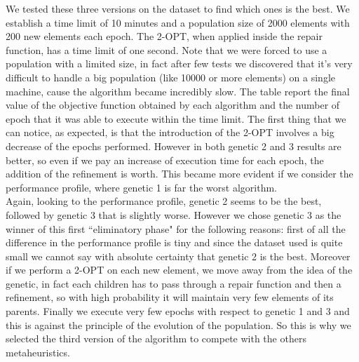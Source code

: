 \noindent We tested these three versions on the dataset to find which ones is the best. We establish a time limit of 10 minutes and a population size of 2000 elements with 200 new elements each epoch. The 2-OPT, when applied inside the repair function, has a time limit of one second. Note that we were forced to use a population with a limited size, in fact after few tests we discovered that it's very difficult to handle a big population (like 10000 or more elements) on a single machine, cause the algorithm became incredibly slow.
The table %
report the final value of the objective function obtained by each algorithm and the number of epoch that it was able to execute within the time limit. The first thing that we can notice, as expected, is that the introduction of the 2-OPT involves a big decrease of the epochs performed. However in both genetic 2 and 3 results are better, so even if we pay an increase of execution time for each epoch, the addition of the refinement is worth. This became more evident if we consider the performance profile, where genetic 1 is far the worst algorithm. \\ 
Again, looking to the performance profile, genetic 2 seems to be the best, followed by genetic 3 that is slightly worse. However we chose genetic 3 as the winner of this first ``eliminatory phase" for the following reasons: first of all the difference in the performance profile is tiny and since the dataset used is quite small we cannot say with absolute certainty that genetic 2 is the best. Moreover if we perform a 2-OPT on each new element, we move away from the idea of the genetic, in fact each children has to pass through a repair function and then a refinement, so with high probability it will maintain very few elements of its parents. Finally we execute very few epochs with respect to genetic 1 and 3 and this is against the principle of the evolution of the population. So this is why we selected the third version of the algorithm to compete with the others metaheuristics.\\

